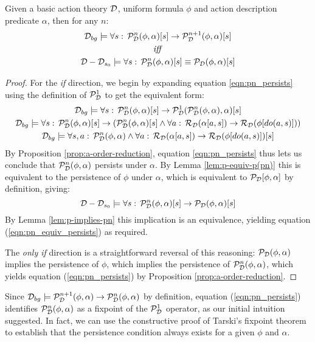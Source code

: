 \begin{thm}
Given a basic action theory $\mathcal{D}$, uniform formula $\phi$
and action description predicate $\alpha$, then for any $n$:\label{thm:p(pn)-equiv-p}\begin{gather}
\mathcal{D}_{bg}\models\forall s:\,\mathcal{P}_{\mathcal{D}}^{n}(\phi,\alpha)[s]\rightarrow\mathcal{P}_{\mathcal{D}}^{n+1}(\phi,\alpha)[s]\label{eqn:pn_persists}\\
\mathit{iff}\nonumber \\
\mathcal{D}-\mathcal{D}_{s_{0}}\models\forall s:\,\mathcal{P}_{\mathcal{D}}^{n}(\phi,\alpha)[s]\equiv\mathcal{P}_{\mathcal{D}}(\phi,\alpha)[s]\label{eqn:pn_equiv_persists}\end{gather}

\end{thm}
\begin{proof}
For the \emph{if} direction, we begin by expanding equation \eqref{eqn:pn_persists}
using the definition of $\mathcal{P}_{\mathcal{D}}^{1}$ to get the
equivalent form:\begin{gather*}
\mathcal{D}_{bg}\models\forall s:\,\mathcal{P}_{\mathcal{D}}^{n}(\phi,\alpha)[s]\rightarrow\mathcal{P}_{\mathcal{D}}^{1}(\mathcal{P}_{\mathcal{D}}^{n}(\phi,\alpha),\alpha)[s]\\
\mathcal{D}_{bg}\models\forall s:\,\mathcal{P}_{\mathcal{D}}^{n}(\phi,\alpha)[s]\rightarrow\left(\mathcal{P}_{\mathcal{D}}^{n}(\phi,\alpha)[s]\wedge\forall a:\,\mathcal{R}_{\mathcal{D}}(\alpha[a,s])\rightarrow\mathcal{R}_{\mathcal{D}}(\phi[do(a,s)])\right)\\
\mathcal{D}_{bg}\models\forall s,a:\,\mathcal{P}_{\mathcal{D}}^{n}(\phi,\alpha)\wedge\forall a:\,\mathcal{R}_{\mathcal{D}}(\alpha[a,s])\rightarrow\mathcal{R}_{\mathcal{D}}(\phi[do(a,s)])[s]\end{gather*}
 By Proposition \ref{prop:a-order-reduction}, equation \eqref{eqn:pn_persists}
thus lets us conclude that $\mathcal{P}_{\mathcal{D}}^{n}(\phi,\alpha)$
persists under $\alpha$. By Lemma \ref{lem:p-equiv-p(pn)} this is
equivalent to the persistence of $\phi$ under $\alpha$, which is
equivalent to $\mathcal{P}_{\mathcal{D}}[\phi,\alpha]$ by definition, giving:\[
\mathcal{D}-\mathcal{D}_{s_{0}}\models\forall s:\,\mathcal{P}_{\mathcal{D}}^{n}(\phi,\alpha)[s]\rightarrow\mathcal{P}_{\mathcal{D}}(\phi,\alpha)[s]\]
 By Lemma \ref{lem:p-implies-pn} this implication is an equivalence,
yielding equation (\ref{eqn:pn_equiv_persists}) as required.

The \emph{only if} direction is a straightforward reversal of this
reasoning: $\mathcal{P}_{\mathcal{D}}(\phi,\alpha)$ implies the persistence
of $\phi$, which implies the persistence of $\mathcal{P}_{\mathcal{D}}^{n}(\phi,\alpha)$,
which yields equation (\ref{eqn:pn_persists}) by Proposition \ref{prop:a-order-reduction}. 
\end{proof}
Since $\mathcal{D}_{bg}\models\mathcal{P}_{\mathcal{D}}^{n+1}(\phi,\alpha)\rightarrow\mathcal{P}_{\mathcal{D}}^{n}(\phi,\alpha)$
by definition, equation (\ref{eqn:pn_persists}) identifies $\mathcal{P}_{\mathcal{D}}^{n}(\phi,\alpha)$
as a fixpoint of the $\mathcal{P}_{\mathcal{D}}^{1}$ operator, as
our initial intuition suggested. In fact, we can use the constructive
proof of Tarski's fixpoint theorem \citep{cousot79constructive_tarski}
to establish that the persistence condition always exists for a given
$\phi$ and $\alpha$.

